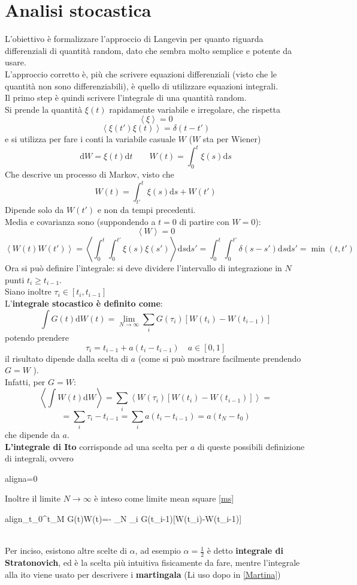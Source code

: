 \documentclass[a4paper,12pt]{article}
\newcommand{\boxedeq}[2]{\begin{empheq}[box={\fboxsep=6pt\fbox}]{align}\label{#1}#2\end{empheq}}
\theoremstyle{plain}
\theoremstyle{definition}
\newcommand{\f}[2]{\frac{#1}{#2}}
\newcommand{\ave}[1]{\left\langle#1\right\rangle }
\renewcommand{\d}{\text{d}}
\newcommand{\ra}{\rightarrow}
\theoremstyle{remark}
\begin{document}
\section{Analisi stocastica}
L'obiettivo è formalizzare l'approccio di Langevin per quanto riguarda differenziali di quantità random, dato che sembra molto semplice e potente da usare. \\L'approccio corretto è, più che scrivere equazioni differenziali (visto che le quantità non sono differenziabili), è quello di  utilizzare equazioni integrali.\\Il primo step è quindi scrivere  l'integrale di una quantità random.
\\ Si prende la quantità $\xi(t)$ rapidamente variabile e irregolare, che rispetta \[\ave{\xi}=0\]\[\ave{\xi(t')\xi(t)}=\delta(t-t')\] e si utilizza per fare i conti la variabile casuale $W$ ($W$ sta per Wiener)
\[\d W=\xi (t)\d t	\quad \quad W(t)=\int_0^t \xi(s)\d s	\]
Che descrive un processo di Markov, visto che
\[W(t)=\int^t_{t'} \xi(s)\d s+W(t')\]
Dipende solo da $W(t')$ e non da tempi precedenti.\\ 
Media e covarianza sono (suppondendo a $t=0$ di partire con $W=0$):
\[\ave{W}=0\]
 \[\ave{W(t)W(t')}=\ave{\int_0^t\int _0^{t'}	\xi(s)\xi(s')		} \d s \d s'=\int _0^t\int _0^{t'} \delta(s-s')\d s \d s'= \min(t,t')\]
Ora si può definire l'integrale:
si deve dividere l'intervallo di integrazione in $N$ punti $t_i\ge t_{i-1}$.\\ Siano inoltre $\tau_i\in [t_i,t_{i-1}]$
\\L'\textbf{integrale stocastico è definito come}:\[\int	 G(t)\d W(t)=\lim_{N\ra \infty} \sum_i G(\tau_i)[W(t_i)-W(t_{i-1})]				\]
	potendo prendere \[\tau_i=t_{i-1}+a(t_i-t_{i-1})\quad a\in [0,1]\]
il risultato dipende dalla scelta di $a$ (come si può mostrare facilmente prendendo $G=W$ 	).\\
Infatti, per $G=W$:
\[\ave{\int W(t)\d W}	=	\sum_i \ave{W(\tau_i)[W(t_i)-W(t_{i-1})]		}=\]
\begin{equation}
=\sum_i \tau_i-t_{i-1}=\sum_i a(t_i-t_{i-1})=a(t_N-t_0)	
\label{aint}
\end{equation}
che dipende da $a$.\\\textbf{L'integrale di Ito} corrisponde ad una scelta per $a$ di queste possibili definizione di integrali, ovvero 
\boxedeq{bb}{a=0}
Inoltre il limite $N\ra \infty$ è inteso come limite mean square \ref{ms}
\boxedeq{Stocint}{\int_{t_0}^{t_M}	 G(t)\d W(t)=-   \: \lim_{N\ra \infty} \sum_i G(t_{i-1})[W(t_i)-W(t_{i-1})]	}
\\ Per inciso, esistono altre scelte di $\alpha$, ad esempio $\alpha=\f{1}{2}$ è detto \textbf{integrale di Stratonovich}, ed è la scelta più intuitiva fisicamente da fare, mentre l'integrale alla ito viene usato per descrivere i \textbf{martingala} (Li uso dopo in \ref{Martina})
\end{document}
